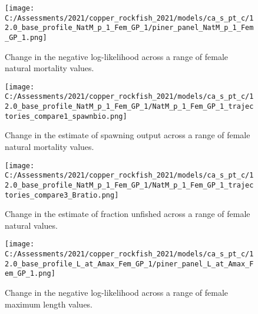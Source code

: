 \documentclass[11pt,
  english,
  a4paper,
]{article}
\begin{document}
\tagmcend\tagstructend


\begin{figure}
\centering
\texttt{[image: C:/Assessments/2021/copper\_rockfish\_2021/models/ca\_s\_pt\_c/12.0\_base\_profile\_NatM\_p\_1\_Fem\_GP\_1/piner\_panel\_NatM\_p\_1\_Fem\_GP\_1.png]}
\caption{Change in the negative log-likelihood across a range of female natural mortality values.\label{fig:m-profile}}
\end{figure}

\tagmcend\tagstructend


\begin{figure}
\centering
\texttt{[image: C:/Assessments/2021/copper\_rockfish\_2021/models/ca\_s\_pt\_c/12.0\_base\_profile\_NatM\_p\_1\_Fem\_GP\_1/NatM\_p\_1\_Fem\_GP\_1\_trajectories\_compare1\_spawnbio.png]}
\caption{Change in the estimate of spawning output across a range of female natural mortality values.\label{fig:m-ssb}}
\end{figure}

\tagmcend\tagstructend


\begin{figure}
\centering
\texttt{[image: C:/Assessments/2021/copper\_rockfish\_2021/models/ca\_s\_pt\_c/12.0\_base\_profile\_NatM\_p\_1\_Fem\_GP\_1/NatM\_p\_1\_Fem\_GP\_1\_trajectories\_compare3\_Bratio.png]}
\caption{Change in the estimate of fraction unfished across a range of female natural values.\label{fig:m-depl}}
\end{figure}

\tagmcend\tagstructend


\begin{figure}
\centering
\texttt{[image: C:/Assessments/2021/copper\_rockfish\_2021/models/ca\_s\_pt\_c/12.0\_base\_profile\_L\_at\_Amax\_Fem\_GP\_1/piner\_panel\_L\_at\_Amax\_Fem\_GP\_1.png]}
\caption{Change in the negative log-likelihood across a range of female maximum length values.\label{fig:linf-profile}}
\end{figure}
\end{document}
